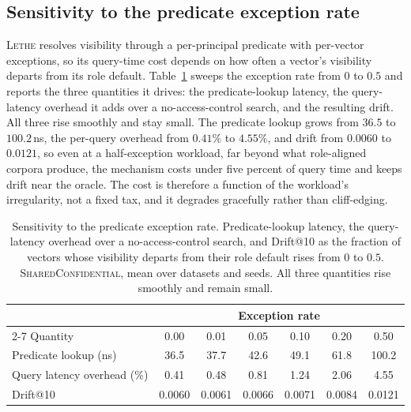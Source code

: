 \documentclass[sigconf, nonacm, review]{acmart}
\begin{document}
\subsection{Sensitivity to the predicate exception rate}
\label{app:exception}
\textsc{Lethe} resolves visibility through a per-principal predicate with
per-vector exceptions, so its query-time cost depends on how often a vector's
visibility departs from its role default. Table~\ref{tab:exception} sweeps the
exception rate from $0$ to $0.5$ and reports the three quantities it drives: the
predicate-lookup latency, the query-latency overhead it adds over a
no-access-control search, and the resulting drift. All three rise smoothly and
stay small. The predicate lookup grows from $36.5$ to $100.2$\,ns, the per-query
overhead from $0.41\%$ to $4.55\%$, and drift from $0.0060$ to $0.0121$, so even
at a half-exception workload, far beyond what role-aligned corpora produce, the
mechanism costs under five percent of query time and keeps drift near the
oracle. The cost is therefore a function of the workload's irregularity, not a
fixed tax, and it degrades gracefully rather than cliff-edging.

\begin{table}[t]
\centering
\caption{Sensitivity to the predicate exception rate. Predicate-lookup latency,
the query-latency overhead over a no-access-control search, and Drift@10 as the
fraction of vectors whose visibility departs from their role default rises from
$0$ to $0.5$. \textsc{SharedConfidential}, mean over datasets and seeds. All
three quantities rise smoothly and remain small.}
\label{tab:exception}
\small
\setlength{\tabcolsep}{10pt}
\begin{tabular}{@{}lcccccc@{}}
\toprule
& \multicolumn{6}{c}{Exception rate} \\
\cmidrule(lr){2-7}
Quantity & 0.00 & 0.01 & 0.05 & 0.10 & 0.20 & 0.50 \\
\midrule
Predicate lookup (ns) & 36.5 & 37.7 & 42.6 & 49.1 & 61.8 & 100.2 \\
Query latency overhead (\%) & 0.41 & 0.48 & 0.81 & 1.24 & 2.06 & 4.55 \\
Drift@10 & 0.0060 & 0.0061 & 0.0066 & 0.0071 & 0.0084 & 0.0121 \\
\bottomrule
\end{tabular}
\end{table}
\end{document}
